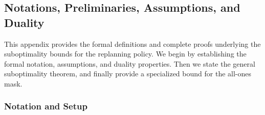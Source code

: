 \documentclass{uai2026} %
\newcommand{\1}{\mathbf{1}}
\newcommand{\ind}[1]{\mathbf{1}\{#1\}}
\newcommand{\prob}{\mathbb{P}}
\newcommand{\expec}{\mathbb{E}}
\newcommand{\err}{\mathrm{err}}
\newcommand{\acal}{\mathcal{A}}
\begin{document}


\subsection{Notations, Preliminaries, Assumptions, and Duality}
\label{app:replanning}

This appendix provides the formal definitions and complete proofs underlying the suboptimality bounds for the replanning policy.
We begin by establishing the formal notation, assumptions, and duality properties.
Then we state the general suboptimality theorem, and finally provide a specialized bound for the all-ones mask.

\subsubsection{Notation and Setup}
\label{app:replanning-prelim}
\end{document}
